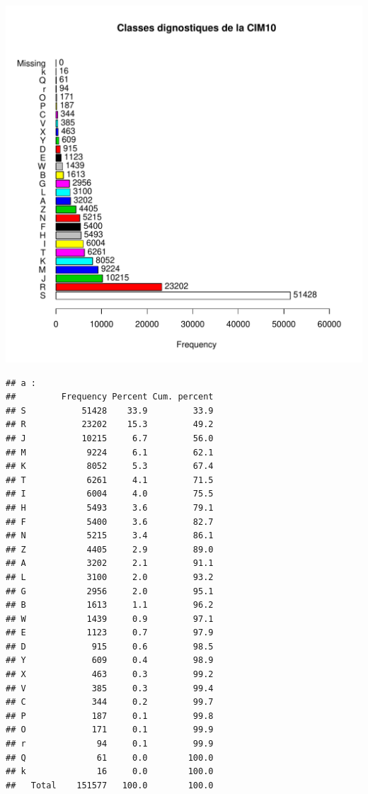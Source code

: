 \documentclass[12pt,english,french,twoside]{report}\usepackage[]{graphicx}\usepackage[]{color}
\makeatletter
\def\maxwidth{ %
  \ifdim\Gin@nat@width>\linewidth
    \linewidth
  \else
    \Gin@nat@width
  \fi
}
\newenvironment{kframe}{%
 \def\at@end@of@kframe{}%
 \ifinner\ifhmode%
  \def\at@end@of@kframe{\end{minipage}}%
  \begin{minipage}{\columnwidth}%
 \fi\fi%
 \def\FrameCommand##1{\hskip\@totalleftmargin \hskip-\fboxsep
 \colorbox{shadecolor}{##1}\hskip-\fboxsep
     \hskip-\linewidth \hskip-\@totalleftmargin \hskip\columnwidth}%
 \MakeFramed {\advance\hsize-\width
   \@totalleftmargin\z@ \linewidth\hsize
   \@setminipage}}%
 {\par\unskip\endMakeFramed%
 \at@end@of@kframe}
\newenvironment{knitrout}{}{} %
\makeatother
\begin{document}
\begin{knitrout}
\color{fgcolor}
\includegraphics[width=\maxwidth]{figure/class_cim10} 
\begin{kframe}\begin{verbatim}
## a :  
##         Frequency Percent Cum. percent
## S           51428    33.9         33.9
## R           23202    15.3         49.2
## J           10215     6.7         56.0
## M            9224     6.1         62.1
## K            8052     5.3         67.4
## T            6261     4.1         71.5
## I            6004     4.0         75.5
## H            5493     3.6         79.1
## F            5400     3.6         82.7
## N            5215     3.4         86.1
## Z            4405     2.9         89.0
## A            3202     2.1         91.1
## L            3100     2.0         93.2
## G            2956     2.0         95.1
## B            1613     1.1         96.2
## W            1439     0.9         97.1
## E            1123     0.7         97.9
## D             915     0.6         98.5
## Y             609     0.4         98.9
## X             463     0.3         99.2
## V             385     0.3         99.4
## C             344     0.2         99.7
## P             187     0.1         99.8
## O             171     0.1         99.9
## r              94     0.1         99.9
## Q              61     0.0        100.0
## k              16     0.0        100.0
##   Total    151577   100.0        100.0
\end{verbatim}
\end{kframe}
\end{knitrout}
\end{document}
